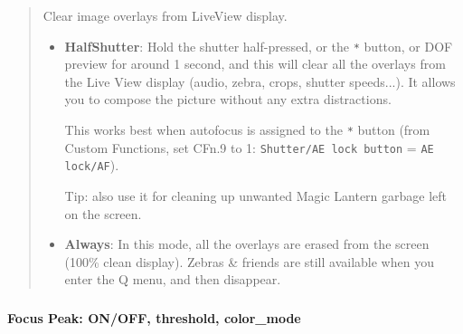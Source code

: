 \documentclass[a4paper,english]{article}
\begin{document}
%
\begin{quote}

Clear image overlays from LiveView display.
%
\begin{itemize}

\item \textbf{HalfShutter}: Hold the shutter half-pressed, or the \texttt{*} button, or DOF preview for around 1 second,
and this will clear all the overlays from the Live View display (audio, zebra, crops, shutter speeds...).
It allows you to compose the picture without any extra distractions.

This works best when autofocus is assigned to the \texttt{*} button (from Custom Functions, set CFn.9 to 1: \texttt{Shutter/AE lock button} = \texttt{AE lock/AF}).

Tip: also use it for cleaning up unwanted Magic Lantern garbage left on the screen.

\item \textbf{Always}: In this mode, all the overlays are erased from the screen (100\% clean display). Zebras \& friends are still available when you enter the Q menu, and then disappear.

\end{itemize}

\end{quote}
\vspace{-10mm}\subsubsection*{}\label{focus-peaking}
\textbf{Focus Peak: ON/OFF, threshold, color\_mode}
%
\end{document}
